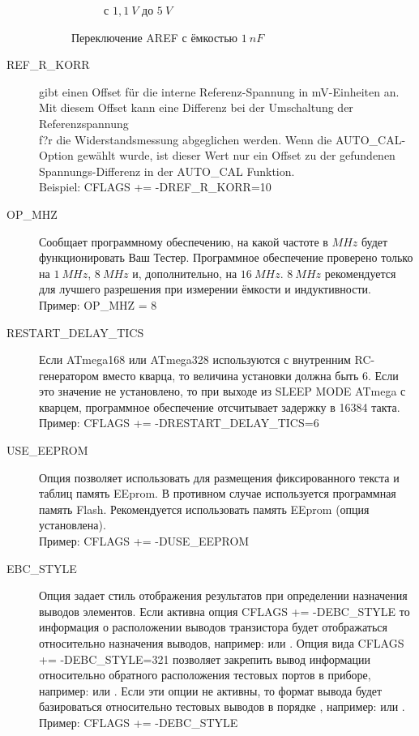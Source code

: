 \begin{description}
\begin{figure}[H]
\begin{subfigure}[b]{.5\textwidth}
    \caption{с \(1,1~V\) до \(5~V\)}
    \label{pic:aref5}
  \end{subfigure}
  \caption{Переключение AREF с ёмкостью \(1~nF\)}
\end{figure}
  \item[REF\_R\_KORR] gibt einen Offset für die interne Referenz-Spannung in mV-Einheiten an.
Mit diesem Offset kann eine Differenz bei der Umschaltung der Referenzspannung\\
f?r die Widerstandsmessung abgeglichen werden.
Wenn die AUTO\_CAL-Option gewählt wurde, ist dieser Wert nur ein Offset zu der gefundenen Spannungs-Differenz in der
AUTO\_CAL Funktion.\\
Beispiel: CFLAGS += -DREF\_R\_KORR=10

  \item[OP\_MHZ] Сообщает программному обеспечению, на какой частоте в \(MHz\) будет функционировать Ваш Тестер. 
Программное обеспечение проверено только на \(1~MHz\), \(8~MHz\) и, дополнительно, на \(16~MHz\). \(8~MHz\) 
рекомендуется для лучшего разрешения при измерении ёмкости и индуктивности.\\
Пример: OP\_MHZ = 8

  \item[RESTART\_DELAY\_TICS] Если ATmega168 или ATmega328 используются с внутренним RC-генератором вместо кварца, 
то величина установки должна быть 6. Если это значение не установлено, то при выходе из SLEEP MODE ATmega с 
кварцем, программное обеспечение отсчитывает задержку в 16384 такта.\\
Пример: CFLAGS += -DRESTART\_DELAY\_TICS=6

  \item[USE\_EEPROM] Опция позволяет использовать для размещения фиксированного текста и таблиц память EEprom. 
В противном случае используется программная память Flash. Рекомендуется использовать память 
EEprom (опция установлена).\\
Пример: CFLAGS += -DUSE\_EEPROM

  \item[EBC\_STYLE] Опция задает стиль отображения результатов при определении назначения выводов элементов. 
Если активна опция CFLAGS += -DEBC\_STYLE то информация о расположении выводов транзистора будет 
отображаться относительно назначения выводов, например:  или . Опция вида 
CFLAGS += -DEBC\_STYLE=321 позволяет закрепить вывод информации относительно обратного расположения 
тестовых портов в приборе, например:  или . Если эти опции не активны, то формат вывода 
будет базироваться относительно тестовых выводов в порядке , например:  или
.\\
Пример: CFLAGS += -DEBC\_STYLE
 

\end{description}
